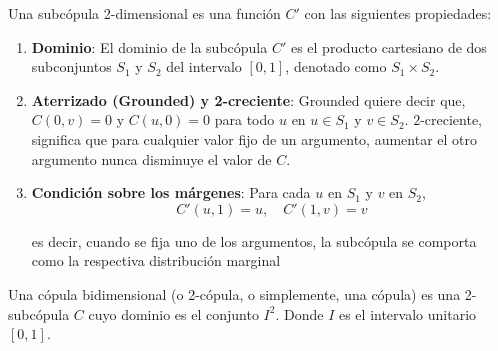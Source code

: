 \begin{defn}[Subcópula]
    Una subcópula 2-dimensional es una función $C'$ con las siguientes propiedades:

    \begin{enumerate}
        \item \textbf{Dominio}: El dominio de la subcópula $C'$ es el producto cartesiano de dos subconjuntos $S_1$ y $S_2$ del intervalo $[0, 1]$, denotado como $S_1 \times S_2$.

        \item \textbf{Aterrizado (Grounded) y 2-creciente}: Grounded quiere decir que, $C(0,v)=0$ y $C(u,0)=0$ para todo $u$ en $u \in S_1$ y $v \in S_2$. 
        $2$-creciente, significa que para cualquier valor fijo de un argumento, aumentar el otro argumento nunca disminuye el valor de $C$.

        \item \textbf{Condición sobre los márgenes}: Para cada $u$ en $S_1$ y $v$ en $S_2$, 
        \begin{equation}
            C'(u, 1) = u, \quad C'(1, v) = v
        \end{equation}

        es decir, cuando se fija uno de los argumentos, la subcópula se comporta como la respectiva distribución marginal
    \end{enumerate}
\end{defn}


\begin{defn}
    Una cópula bidimensional (o 2-cópula, o simplemente, una cópula) es una 2-subcópula $C$ cuyo dominio es el conjunto $I^2$. Donde $I$ es el intervalo unitario $[0,1]$. 
\end{defn}



